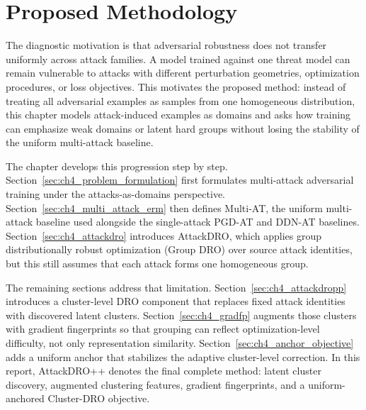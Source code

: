 
\chapter{Proposed Methodology}
\label{chap:methodology}

The diagnostic motivation is that adversarial robustness does not transfer uniformly across
attack families. A model trained against one threat model can remain vulnerable
to attacks with different perturbation geometries, optimization procedures, or
loss objectives. This motivates the proposed method: instead of treating all
adversarial examples as samples from one homogeneous distribution, this chapter
models attack-induced examples as domains and asks how training can emphasize
weak domains or latent hard groups without losing the stability of the uniform
multi-attack baseline.

The chapter develops this progression step by step. Section~\ref{sec:ch4_problem_formulation}
first formulates multi-attack adversarial training under the attacks-as-domains
perspective. Section~\ref{sec:ch4_multi_attack_erm} then defines Multi-AT, the
uniform multi-attack baseline used alongside the single-attack PGD-AT and DDN-AT
baselines. Section~\ref{sec:ch4_attackdro} introduces AttackDRO, which applies
group distributionally robust optimization (Group DRO) over source attack
identities, but this still assumes that each attack forms one homogeneous group.

The remaining sections address that limitation. Section~\ref{sec:ch4_attackdropp}
introduces a cluster-level DRO component that replaces fixed attack identities
with discovered latent clusters. Section~\ref{sec:ch4_gradfp} augments those
clusters with gradient fingerprints so that grouping can reflect optimization-level
difficulty, not only representation similarity. Section~\ref{sec:ch4_anchor_objective}
adds a uniform anchor that stabilizes the adaptive cluster-level correction.
In this report, AttackDRO++ denotes the final complete method: latent cluster
discovery, augmented clustering features, gradient fingerprints, and a
uniform-anchored Cluster-DRO objective.









